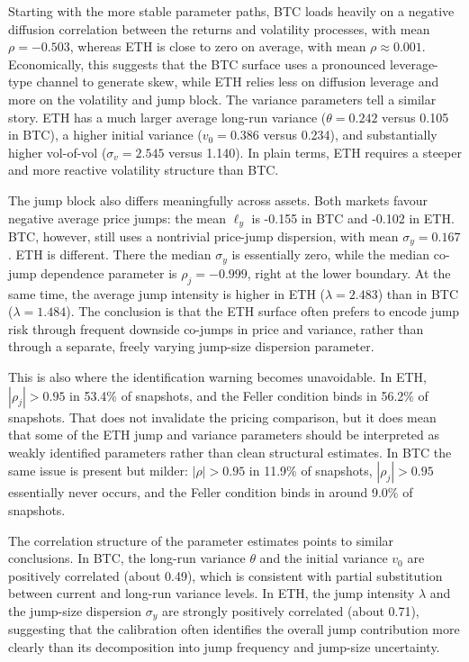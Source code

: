 \documentclass[a4paper,titlepage,12pt]{report}
\theoremstyle{plain}
\begin{document}
Starting with the more stable parameter paths, BTC loads heavily on a negative diffusion correlation between the returns and volatility processes, with mean $\rho=-0.503$, whereas ETH is close to zero on average, with mean $\rho\approx 0.001$. Economically, this suggests that the BTC surface uses a pronounced leverage-type channel to generate skew, while ETH relies less on diffusion leverage and more on the volatility and jump block. The variance parameters tell a similar story. ETH has a much larger average long-run variance ($\theta=0.242$ versus 0.105 in BTC), a higher initial variance ($v_0=0.386$ versus 0.234), and substantially higher vol-of-vol ($\sigma_v=2.545$ versus 1.140). In plain terms, ETH requires a steeper and more reactive volatility structure than BTC.

The jump block also differs meaningfully across assets. Both markets favour negative average price jumps: the mean $\ell_y$ is -0.155 in BTC and -0.102 in ETH. BTC, however, still uses a nontrivial price-jump dispersion, with mean $\sigma_y=0.167$. ETH is different. There the median $\sigma_y$ is essentially zero, while the median co-jump dependence parameter is $\rho_j=-0.999$, right at the lower boundary. At the same time, the average jump intensity is higher in ETH ($\lambda=2.483$) than in BTC ($\lambda=1.484$). The conclusion is that the ETH surface often prefers to encode jump risk through frequent downside co-jumps in price and variance, rather than through a separate, freely varying jump-size dispersion parameter.

This is also where the identification warning becomes unavoidable. In ETH, $|\rho_j|>0.95$ in 53.4\% of snapshots, and the Feller condition binds in 56.2\% of snapshots. That does not invalidate the pricing comparison, but it does mean that some of the ETH jump and variance parameters should be interpreted as weakly identified parameters rather than clean structural estimates. In BTC the same issue is present but milder: $|\rho|>0.95$ in 11.9\% of snapshots, $|\rho_j|>0.95$ essentially never occurs, and the Feller condition binds in around 9.0\% of snapshots.

The correlation structure of the parameter estimates points to similar conclusions. In BTC, the long-run variance $\theta$ and the initial variance $v_0$ are positively correlated (about 0.49), which is consistent with partial substitution between current and long-run variance levels. In ETH, the jump intensity $\lambda$ and the jump-size dispersion $\sigma_y$ are strongly positively correlated (about 0.71), suggesting that the calibration often identifies the overall jump contribution more clearly than its decomposition into jump frequency and jump-size uncertainty.
\end{document}
